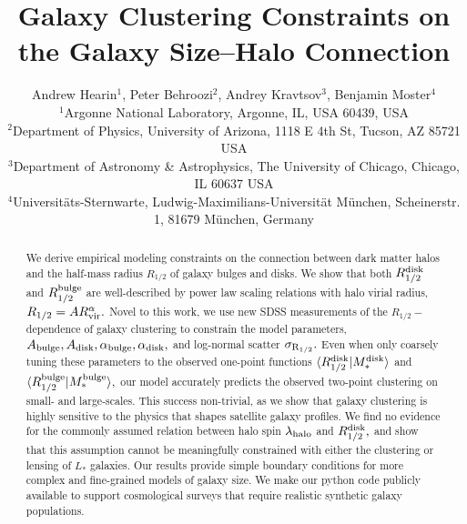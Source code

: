 \documentclass[usenatbib,usegraphicx,letterpaper]{mn2e}
\newcommand{\rhalf}{R_{1/2}}
\newcommand{\rhalfdisk}{R_{1/2}^{\rm disk}}
\newcommand{\rhalfbulge}{R_{1/2}^{\rm bulge}}
\newcommand{\sigmarhalf}{\sigma_{\rm R_{1/2}}}
\newcommand{\rvir}{R_{\rm vir}}
\newcommand{\mstar}{M_{\ast}}
\newcommand{\halospin}{\lambda_{\rm halo}}
\begin{document}
\title[The Galaxy Size--Halo Connection]
{Galaxy Clustering Constraints on the Galaxy Size--Halo Connection}


\author[Hearin, Behroozi, Kravtsov \& Moster]{
Andrew Hearin$^{1}$, Peter Behroozi$^{2}$, Andrey Kravtsov$^{3}$, Benjamin Moster$^{4}$\\
$^{1}$Argonne National Laboratory, Argonne, IL, USA 60439, USA\\
$^{2}$Department of Physics, University of Arizona, 1118 E 4th St, Tucson, AZ 85721 USA\\
$^{3}$Department of Astronomy \& Astrophysics, The University of Chicago, Chicago, IL 60637 USA\\
$^{4}$Universit{\"a}ts-Sternwarte, Ludwig-Maximilians-Universit{\"a}t M{\"u}nchen, Scheinerstr. 1, 81679 M{\"u}nchen, Germany
}

\maketitle

\begin{abstract}
We derive empirical modeling constraints on the connection between dark matter halos and the half-mass radius $\rhalf$ of galaxy bulges and disks. We show that both $\rhalfdisk$ and $\rhalfbulge$ are well-described by power law scaling relations with halo virial radius, $\rhalf=A\rvir^{\alpha}.$ Novel to this work, we use new SDSS measurements of the $\rhalf-$dependence of galaxy clustering to constrain the model parameters, $A_{\rm bulge}, A_{\rm disk}, \alpha_{\rm bulge},\alpha_{\rm disk},$ and log-normal scatter $\sigmarhalf.$ Even when only coarsely tuning these parameters to the observed one-point functions $\langle\rhalfdisk|\mstar^{\rm disk}\rangle$ and $\langle\rhalfbulge|\mstar^{\rm bulge}\rangle,$ our model accurately predicts the observed two-point clustering on small- and large-scales. This success non-trivial, as we show that galaxy clustering is highly sensitive to the physics that shapes satellite galaxy profiles. We find no evidence for the commonly assumed relation between halo spin $\halospin$ and $\rhalfdisk,$ and show that this assumption cannot be meaningfully constrained with either the clustering or lensing of  $L_{\ast}$ galaxies. Our results provide simple boundary conditions for more complex and fine-grained models of galaxy size. We make our python code publicly available to support cosmological surveys that require realistic synthetic galaxy populations.
\end{abstract}
\end{document}
